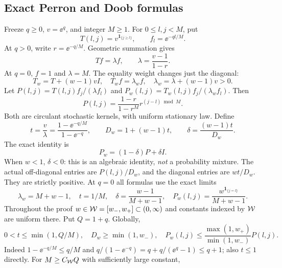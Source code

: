 \documentclass[11pt,a4paper]{article}
\theoremstyle{remark}\newtheorem{remark}[theorem]{Remark}
\newcommand{\ind}{\mathbf 1}\newcommand{\wasc}{\operatorname{wasc}}\newcommand{\dasc}{\operatorname{dasc}}
\numberwithin{equation}{section}
\begin{document}
\subsection{Exact Perron and Doob formulas}
Freeze $q\ge0$, $v=\ee^q$, and integer $M\ge1$. For $0\le l,j<M$, put
\[
T(l,j)=v^{\ind_{\{j\ge l\}}},\qquad f_l=\ee^{-ql/M}.
\]
At $q>0$, write $r=\ee^{-q/M}$. Geometric summation gives
\begin{equation}\label{wasc:lv:eq:eigen}
Tf=\lambda f,\qquad \lambda=\frac{v-1}{1-r}.
\end{equation}
At $q=0$, $f=1$ and $\lambda=M$. The equality weight changes just the diagonal:
\begin{equation}\label{wasc:lv:eq:weightedeigen}
T_w=T+(w-1)vI,\quad T_wf=\lambda_w f,\quad
\lambda_w=\lambda+(w-1)v>0.
\end{equation}
Let $P(l,j)=T(l,j)f_j/(\lambda f_l)$ and
$P_w(l,j)=T_w(l,j)f_j/(\lambda_w f_l)$. Then
\begin{equation}\label{wasc:lv:eq:kernel}
P(l,j)=\frac{1-r}{1-r^M}r^{(j-l)\bmod M}.
\end{equation}
Both are circulant stochastic kernels, with uniform stationary law. Define
\begin{equation}\label{wasc:lv:eq:delta}
t=\frac v\lambda=\frac{1-\ee^{-q/M}}{1-\ee^{-q}},\qquad
D_w=1+(w-1)t,\qquad \delta=\frac{(w-1)t}{D_w}.
\end{equation}
The exact identity is
\begin{equation}\label{wasc:lv:eq:mixture}
P_w=(1-\delta)P+\delta I.
\end{equation}
When $w<1$, $\delta<0$: this is an algebraic identity, \emph{not} a probability mixture. The actual off-diagonal entries are $P(l,j)/D_w$, and the diagonal entries are $wt/D_w$. They are strictly positive.
At $q=0$ all formulas use the exact limits
\begin{equation}\label{wasc:lv:eq:qzero}
\lambda_w=M+w-1,\quad t=1/M,\quad\delta=\frac{w-1}{M+w-1},\quad
P_w(l,j)=\frac{w^{\ind_{\{j=l\}}}}{M+w-1}.
\end{equation}
Throughout the proof $w\in\mathcal W=[w_-,w_+]\subset(0,\infty)$ and constants indexed by $\mathcal W$ are uniform there. Put $Q=1+q$. Globally,
\begin{equation}\label{wasc:lv:eq:dominate}
0<t\le\min(1,Q/M),\quad D_w\ge\min(1,w_-),\quad
P_w(l,j)\le\frac{\max(1,w_+)}{\min(1,w_-)}P(l,j).
\end{equation}
Indeed $1-\ee^{-q/M}\le q/M$ and $q/(1-\ee^{-q})=q+q/(\ee^q-1)\le q+1$; also $t\le1$ directly.
For $M\ge C_{\mathcal W}Q$ with sufficiently large constant,
\end{document}
